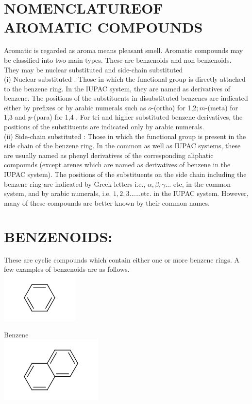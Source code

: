 \documentclass[10pt]{article}
\begin{document}
\section*{NOMENCLATUREOF AROMATIC COMPOUNDS}
Aromatic is regarded as aroma means pleasant smell. Aromatic compounds may be classified into two main types. These are benzenoids and non-benzenoids. They may be nuclear substituted and side-chain substituted\\
(i) Nuclear substituted : Those in which the functional group is directly attached to the benzene ring. In the IUPAC system, they are named as derivatives of benzene. The positions of the substituents in disubstituted benzenes are indicated either by prefixes or by arabic numerals such as $o$-(ortho) for 1,$2 ; m$-(meta) for 1,3 and $p$-(para) for 1,4 . For tri and higher substituted benzene derivatives, the positions of the substituents are indicated only by arabic numerals.\\
(ii) Side-chain substituted : Those in which the functional group is present in the side chain of the benzene ring. In the common as well as IUPAC systems, these are usually named as phenyl derivatives of the corresponding aliphatic compounds (except arenes which are named as derivatives of benzene in the IUPAC system). The positions of the substituents on the side chain including the benzene ring are indicated by Greek letters i.e., $\alpha, \beta, \gamma \ldots$ etc, in the common system, and by arabic numerals, i.e. $1,2,3$......etc. in the IUPAC system. However, many of these compounds are better known by their common names.

\section*{BENZENOIDS:}
These are cyclic compounds which contain either one or more benzene rings. A few examples of benzenoids are as follows.\\
\includegraphics{smile-8236c6596baa066c9b628bf8083f8d45f9a6f98d}

Benzene\\
\includegraphics{smile-1c35c4c715ec5e03b48dff9972f454eb919c1571}
\end{document}
